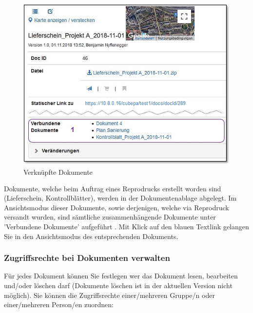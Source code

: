 \begin{figure}   %
  \vspace{-25pt}      %
  \begin{center}
    \includegraphics[width=1\linewidth]{../chapters/11_Dokumentenablage/pictures/repro_verk_Dokumente.jpg}
  \end{center}
  \vspace{-20pt}
  \caption{Verknüpfte Dokumente}
  \vspace{-10pt}
\end{figure}
Dokumente, welche beim Auftrag eines Reprodrucks erstellt worden sind (Lieferschein, Kontrollblätter), werden in der Dokumentenablage abgelegt. Im Ansichtsmodus dieser Dokumente, sowie derjenigen, welche via Reprodruck versandt wurden, sind sämtliche zusammenhängende Dokumente unter 'Verbundene Dokumente' aufgeführt . Mit Klick auf den blauen Textlink gelangen Sie in den Ansichtsmodus des entsprechenden Dokuments.

\pagebreak
\subsubsection{Zugriffsrechte bei Dokumenten verwalten}
\label{bkm:Ref442869495}

Für jedes Dokument können Sie festlegen wer das Dokument lesen, bearbeiten und/oder löschen darf (Dokumente löschen ist in der aktuellen Version nicht möglich). Sie können die Zugriffsrechte einer/mehreren Gruppe/n oder einer/mehreren Person/en zuordnen:

